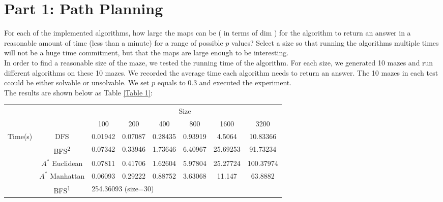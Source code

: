 \documentclass[letter]{article}
\begin{document}
\section{Part 1: Path Planning}
\label{sec:Part 1: Path Planning}

\begin{questions}
	\item {For each of the implemented algorithms, how large the maps can be ( in terms of dim ) for the algorithm to return an answer in a reasonable amount of time (less than a minute) for a range of possible $ p $ values? Select a size so that running the algorithms multiple times will not be a huge time commitment, but that the maps are large enough to be interesting.} \\
	
	In order to find a reasonable size of the maze, we tested the running time of the algorithm. For each size, we generated 10 mazes and run different algorithms on these 10 mazes. We recorded the average time each algorithm needs to return an answer. The 10 mazes in each test ccould be either solvable or unsolvable. We set $ p $ equals to 0.3 and executed the experiment. \\
	The results are shown below as Table \ref{Table 1}:  \\
	
	\begin{center}
		\label{Table 1}
		\begin{tabular}[h]{| c | c | c | c | c | c | c | c |}
			\hline
			\multicolumn{2}{|c|}{} & \multicolumn{6}{c|}{Size} \\
			\cline{3-8}
			\multicolumn{2}{|c|}{} & 100 & 200 & 400 & 800 & 1600 & 3200 \\
			\hline
			\multirow{5}{*}{Time(s)} & DFS & 0.01942 & 0.07087 & 0.28435 & 0.93919 & 4.5064 & 10.83366 \\
			\cline{2-8}
			 & BFS\textsuperscript{2} & 0.07342 & 0.33946 & 1.73646 & 6.40967 & 25.69253 & 91.73234 \\
			 \cline{2-8}
			 & $ A^* $ Euclidean & 0.07811 & 0.41706 & 1.62604 & 5.97804 & 25.27724 & 100.37974 \\
			 \cline{2-8}
			 & $ A^* $ Manhattan & 0.06093 & 0.29222 & 0.88752 & 3.63068 & 11.147 & 63.8882 \\
			 \cline{2-8}
			 & BFS\textsuperscript{1} & \multicolumn{6}{l|}{254.36093 (size=30)} \\
			 \hline
		\end{tabular}
	\end{center}


\end{questions}
\end{document}

